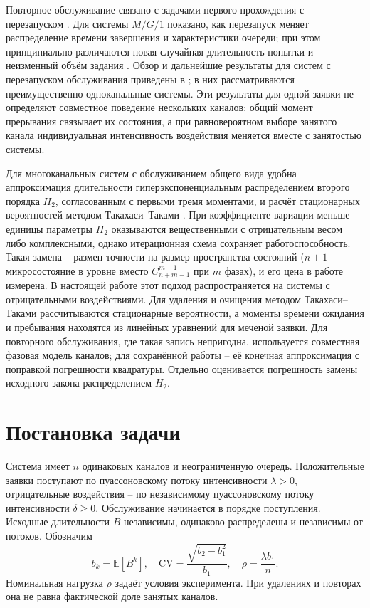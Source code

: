 \documentclass[a4paper,12pt]{article}
\begin{document}
Повторное обслуживание связано с задачами первого прохождения с перезапуском \cite{pal2017}. Для системы \(M/G/1\) показано, как перезапуск меняет распределение времени завершения и характеристики очереди; при этом принципиально различаются новая случайная длительность попытки и неизменный объём задания \cite{bonomo2022}. Обзор и дальнейшие результаты для систем с перезапуском обслуживания приведены в \cite{roy2024,bonomo2025}; в них рассматриваются преимущественно одноканальные системы. Эти результаты для одной заявки не определяют совместное поведение нескольких каналов: общий момент прерывания связывает их состояния, а при равновероятном выборе занятого канала индивидуальная интенсивность воздействия меняется вместе с занятостью системы.

Для многоканальных систем с обслуживанием общего вида удобна аппроксимация длительности гиперэкспоненциальным распределением второго порядка \(H_2\), согласованным с первыми тремя моментами, и расчёт стационарных вероятностей методом Такахаси--Таками \cite{takahashi1976,ryzhikov2018ru}. При коэффициенте вариации меньше единицы параметры \(H_2\) оказываются вещественными с отрицательным весом либо комплексными, однако итерационная схема сохраняет работоспособность. Такая замена -- размен точности на размер пространства состояний (\(n+1\) микросостояние в уровне вместо \(C_{n+m-1}^{m-1}\) при \(m\) фазах), и его цена в работе измерена. В настоящей работе этот подход распространяется на системы с отрицательными воздействиями. Для удаления и очищения методом Такахаси--Таками рассчитываются стационарные вероятности, а моменты времени ожидания и пребывания находятся из линейных уравнений для меченой заявки. Для повторного обслуживания, где такая запись непригодна, используется совместная фазовая модель каналов; для сохранённой работы -- её конечная аппроксимация с поправкой погрешности квадратуры. Отдельно оценивается погрешность замены исходного закона распределением \(H_2\).

\section{Постановка задачи}
Система имеет \(n\) одинаковых каналов и неограниченную очередь. Положительные заявки поступают по пуассоновскому потоку интенсивности \(\lambda>0\), отрицательные воздействия -- по независимому пуассоновскому потоку интенсивности \(\delta\ge0\). Обслуживание начинается в порядке поступления. Исходные длительности \(B\) независимы, одинаково распределены и независимы от потоков. Обозначим
\[
b_k=\mathbb E[B^k],\quad \mathrm{CV}=\frac{\sqrt{b_2-b_1^2}}{b_1},\quad \rho=\frac{\lambda b_1}{n}.
\]
Номинальная нагрузка \(\rho\) задаёт условия эксперимента. При удалениях и повторах она не равна фактической доле занятых каналов.
\end{document}
